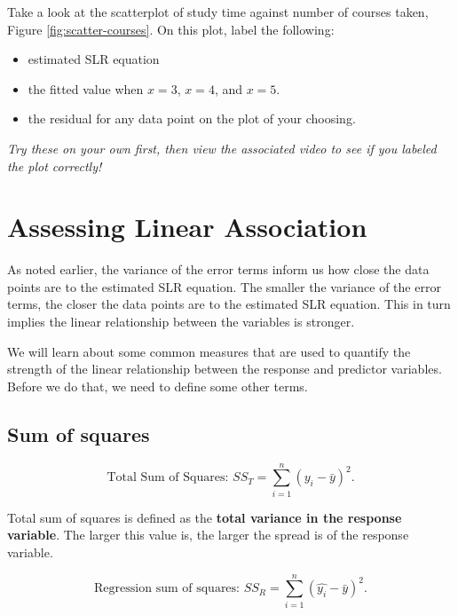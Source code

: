 \documentclass[
]{book}
\providecommand{\tightlist}{%
  \setlength{\itemsep}{0pt}\setlength{\parskip}{0pt}}
\begin{document}
Take a look at the scatterplot of study time against number of courses taken, Figure \ref{fig:scatter-courses}. On this plot, label the following:

\begin{itemize}
\tightlist
\item
  estimated SLR equation
\item
  the fitted value when \(x=3\), \(x=4\), and \(x=5\).
\item
  the residual for any data point on the plot of your choosing.
\end{itemize}

\emph{Try these on your own first, then view the associated video to see if you labeled the plot correctly!}

\hypertarget{assessing-linear-association}{%
\section{Assessing Linear Association}\label{assessing-linear-association}}

As noted earlier, the variance of the error terms inform us how close the data points are to the estimated SLR equation. The smaller the variance of the error terms, the closer the data points are to the estimated SLR equation. This in turn implies the linear relationship between the variables is stronger.

We will learn about some common measures that are used to quantify the strength of the linear relationship between the response and predictor variables. Before we do that, we need to define some other terms.

\hypertarget{sum-of-squares}{%
\subsection{Sum of squares}\label{sum-of-squares}}

\begin{equation} 
\text{Total Sum of Squares: } SS_T = \sum\limits_{i=1}^{n} (y_i - \bar{y})^{2}.
\label{eq:SST}
\end{equation}

Total sum of squares is defined as the \textbf{total variance in the response variable}. The larger this value is, the larger the spread is of the response variable.

\begin{equation} 
\text{Regression sum of squares: } SS_R = \sum\limits_{i=1}^{n} (\hat{y_i} - \bar{y})^{2}.
\label{eq:SSR}
\end{equation}
\end{document}
